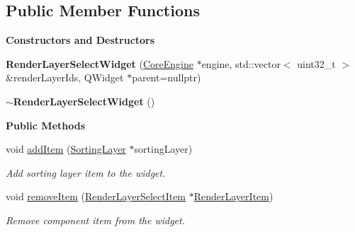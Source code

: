 \subsection*{Public Member Functions}
\begin{Indent}\textbf{ Constructors and Destructors}\par
\begin{DoxyCompactItemize}
\item 
\mbox{\label{classrev_1_1_view_1_1_render_layer_select_widget_ae9be87a93acbf14a92639bcaa950dad5}} 
{\bfseries Render\+Layer\+Select\+Widget} (\mbox{\hyperlink{classrev_1_1_core_engine}{Core\+Engine}} $\ast$engine, std\+::vector$<$ uint32\+\_\+t $>$ \&render\+Layer\+Ids, Q\+Widget $\ast$parent=nullptr)
\item 
\mbox{\label{classrev_1_1_view_1_1_render_layer_select_widget_af68a0b68ad8e603a5bc550caaa46c70c}} 
{\bfseries $\sim$\+Render\+Layer\+Select\+Widget} ()
\end{DoxyCompactItemize}
\end{Indent}
\begin{Indent}\textbf{ Public Methods}\par
\begin{DoxyCompactItemize}
\item 
\mbox{\label{classrev_1_1_view_1_1_render_layer_select_widget_a4ff34a1d4b9c7569362d0f44ef89f123}} 
void \mbox{\hyperlink{classrev_1_1_view_1_1_render_layer_select_widget_a4ff34a1d4b9c7569362d0f44ef89f123}{add\+Item}} (\mbox{\hyperlink{structrev_1_1_sorting_layer}{Sorting\+Layer}} $\ast$sorting\+Layer)
\begin{DoxyCompactList}\small\item\em Add sorting layer item to the widget. \end{DoxyCompactList}\item 
\mbox{\label{classrev_1_1_view_1_1_render_layer_select_widget_afb5cf255a66a5baba66271aebc5bce63}} 
void \mbox{\hyperlink{classrev_1_1_view_1_1_render_layer_select_widget_afb5cf255a66a5baba66271aebc5bce63}{remove\+Item}} (\mbox{\hyperlink{classrev_1_1_view_1_1_render_layer_select_item}{Render\+Layer\+Select\+Item}} $\ast$\mbox{\hyperlink{classrev_1_1_view_1_1_render_layer_item}{Render\+Layer\+Item}})
\begin{DoxyCompactList}\small\item\em Remove component item from the widget. \end{DoxyCompactList}\end{DoxyCompactItemize}
\end{Indent}
